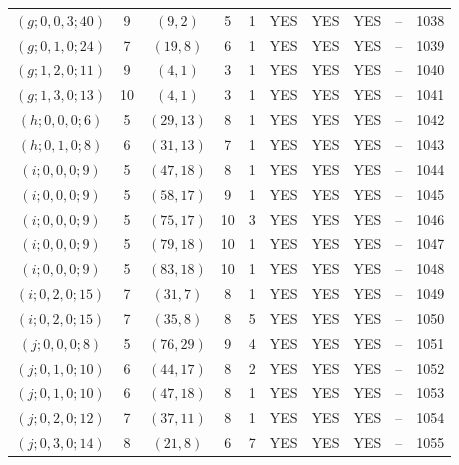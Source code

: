 \begin{longtable}{|c|c|c|c|c|c|c|c|c|c|}
$(g; 0, 0, 3; 40)$ & 9 & $(9, 2)$ & 5 & 1 & YES & YES & YES & -- & 1038\\
$(g; 0, 1, 0; 24)$ & 7 & $(19, 8)$ & 6 & 1 & YES & YES & YES & -- & 1039\\
$(g; 1, 2, 0; 11)$ & 9 & $(4, 1)$ & 3 & 1 & YES & YES & YES & -- & 1040\\
$(g; 1, 3, 0; 13)$ & 10 & $(4, 1)$ & 3 & 1 & YES & YES & YES & -- & 1041\\
$(h; 0, 0, 0; 6)$ & 5 & $(29, 13)$ & 8 & 1 & YES & YES & YES & -- & 1042\\
$(h; 0, 1, 0; 8)$ & 6 & $(31, 13)$ & 7 & 1 & YES & YES & YES & -- & 1043\\
$(i; 0, 0, 0; 9)$ & 5 & $(47, 18)$ & 8 & 1 & YES & YES & YES & -- & 1044\\
$(i; 0, 0, 0; 9)$ & 5 & $(58, 17)$ & 9 & 1 & YES & YES & YES & -- & 1045\\
$(i; 0, 0, 0; 9)$ & 5 & $(75, 17)$ & 10 & 3 & YES & YES & YES & -- & 1046\\
$(i; 0, 0, 0; 9)$ & 5 & $(79, 18)$ & 10 & 1 & YES & YES & YES & -- & 1047\\
$(i; 0, 0, 0; 9)$ & 5 & $(83, 18)$ & 10 & 1 & YES & YES & YES & -- & 1048\\
$(i; 0, 2, 0; 15)$ & 7 & $(31, 7)$ & 8 & 1 & YES & YES & YES & -- & 1049\\
$(i; 0, 2, 0; 15)$ & 7 & $(35, 8)$ & 8 & 5 & YES & YES & YES & -- & 1050\\
$(j; 0, 0, 0; 8)$ & 5 & $(76, 29)$ & 9 & 4 & YES & YES & YES & -- & 1051\\
$(j; 0, 1, 0; 10)$ & 6 & $(44, 17)$ & 8 & 2 & YES & YES & YES & -- & 1052\\
$(j; 0, 1, 0; 10)$ & 6 & $(47, 18)$ & 8 & 1 & YES & YES & YES & -- & 1053\\
$(j; 0, 2, 0; 12)$ & 7 & $(37, 11)$ & 8 & 1 & YES & YES & YES & -- & 1054\\
$(j; 0, 3, 0; 14)$ & 8 & $(21, 8)$ & 6 & 7 & YES & YES & YES & -- & 1055
\end{longtable}
